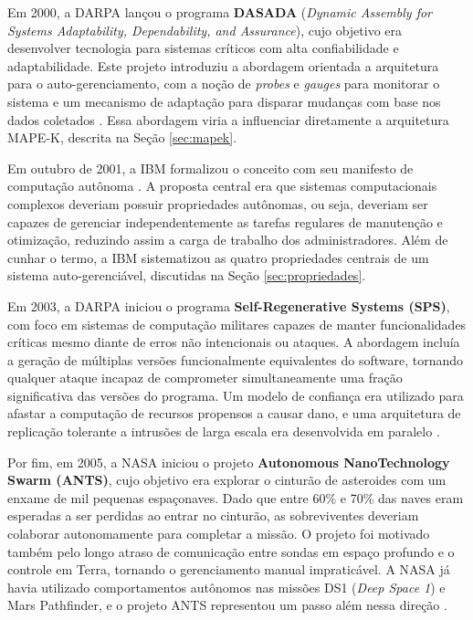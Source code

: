 Em 2000, a DARPA lançou o programa \textbf{DASADA} (\textit{Dynamic Assembly for Systems Adaptability, Dependability, and Assurance}), cujo objetivo era desenvolver tecnologia para sistemas críticos com alta confiabilidade e adaptabilidade. Este projeto introduziu a abordagem orientada a arquitetura para o auto-gerenciamento, com a noção de \textit{probes} e \textit{gauges} para monitorar o sistema e um mecanismo de adaptação para disparar mudanças com base nos dados coletados \cite{W1999392360}. Essa abordagem viria a influenciar diretamente a arquitetura MAPE-K, descrita na Seção \ref{sec:mapek}.

Em outubro de 2001, a IBM formalizou o conceito com seu manifesto de computação autônoma \cite{ibm2001}. A proposta central era que sistemas computacionais complexos deveriam possuir propriedades autônomas, ou seja, deveriam ser capazes de gerenciar independentemente as tarefas regulares de manutenção e otimização, reduzindo assim a carga de trabalho dos administradores. Além de cunhar o termo, a IBM sistematizou as quatro propriedades centrais de um sistema auto-gerenciável, discutidas na Seção \ref{sec:propriedades}.

Em 2003, a DARPA iniciou o programa \textbf{Self-Regenerative Systems (SPS)}, com foco em sistemas de computação militares capazes de manter funcionalidades críticas mesmo diante de erros não intencionais ou ataques. A abordagem incluía a geração de múltiplas versões funcionalmente equivalentes do software, tornando qualquer ataque incapaz de comprometer simultaneamente uma fração significativa das versões do programa. Um modelo de confiança era utilizado para afastar a computação de recursos propensos a causar dano, e uma arquitetura de replicação tolerante a intrusões de larga escala era desenvolvida em paralelo \cite{W1999392360}.

Por fim, em 2005, a NASA iniciou o projeto \textbf{Autonomous NanoTechnology Swarm (ANTS)}, cujo objetivo era explorar o cinturão de asteroides com um enxame de mil pequenas espaçonaves. Dado que entre 60\% e 70\% das naves eram esperadas a ser perdidas ao entrar no cinturão, as sobreviventes deveriam colaborar autonomamente para completar a missão. O projeto foi motivado também pelo longo atraso de comunicação entre sondas em espaço profundo e o controle em Terra, tornando o gerenciamento manual impraticável. A NASA já havia utilizado comportamentos autônomos nas missões DS1 (\textit{Deep Space 1}) e Mars Pathfinder, e o projeto ANTS representou um passo além nessa direção \cite{W1999392360}.

